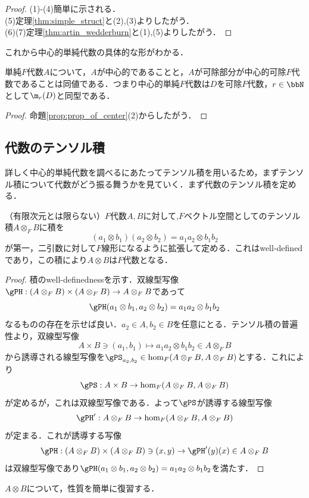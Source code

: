 \documentclass[a4paper,11pt]{jsarticle}
\begin{document}
\begin{proof}(1)-(4)簡単に示される．\\
  (5)定理\ref{thm:simple_struct}と(2),(3)よりしたがう．\\
  (6)(7)定理\ref{thm:artin_wedderburn}と(1),(5)よりしたがう．
\end{proof}
これから中心的単純代数の具体的な形がわかる．
\begin{prop}[中心的単純代数の構造]
  単純$F$代数$A$について，$A$が中心的であることと，$A$が可除部分が中心的可除$F$代数であることは同値である．つまり中心的単純$F$代数は$D$を可除$F$代数，$r\in\bbN$として$\m_r(D)$と同型である．
\end{prop}
\begin{proof}
  命題\ref{prop:prop_of_center}(2)からしたがう．
\end{proof}
\subsection{代数のテンソル積}
詳しく中心的単純代数を調べるにあたってテンソル積を用いるため，まずテンソル積について代数がどう振る舞うかを見ていく．まず代数のテンソル積を定める．
\begin{dfn}[$F$代数のテンソル積]
  （有限次元とは限らない）$F$代数$A,B$に対して,$F$ベクトル空間としてのテンソル積$A\otimes_F B$に積を
  \[
    (a_1\otimes b_1)(a_2\otimes b_2)=a_1a_2\otimes b_1b_2
  \]
  が第一，二引数に対して$F$線形になるように拡張して定める．これはwell-definedであり，この積により$A\otimes B$は$F$代数となる．
\end{dfn}
\begin{proof}
  積のwell-definednessを示す．双線型写像$\gPH:(A\otimes_F B)\times(A\otimes_F B)\to A\otimes_F B$であって
  \[
    \gPH(a_1\otimes b_1,a_2\otimes b_2)=a_1a_2\otimes b_1b_2
  \]
  なるものの存在を示せば良い．$a_2\in A,b_2\in B$を任意にとる．テンソル積の普遍性より，双線型写像
  \[
    A\times B\ni (a_1,b_1)\mapsto a_1a_2\otimes b_1b_2 \in A\otimes_F B
  \]
  から誘導される線型写像を$\gPS_{a_2,b_2}\in\hom_F(A\otimes_F B, A\otimes_F B)$とする．これにより
  \[
    \gPS:A\times B \to \hom_F(A\otimes_F B,A\otimes_F B)
  \]
  が定めるが，これは双線型写像である．よって$\gPS$が誘導する線型写像
  \[
    \gPH':A\otimes_F B\to\hom_F(A\otimes_F B,A\otimes_F B)
  \]
  が定まる．これが誘導する写像
  \[
    \gPH:(A\otimes_F B)\times(A\otimes_F B)\ni (x,y)\to\gPH'(y)(x)\in A\otimes_F B
  \]
  は双線型写像であり$\gPH(a_1\otimes b_1,a_2\otimes b_2)=a_1a_2\otimes b_1b_2$を満たす．
\end{proof}
$A\otimes B$について，性質を簡単に復習する．
\end{document}
